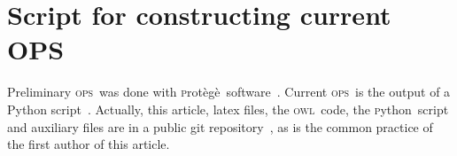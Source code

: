 \documentclass[10pt,letterpaper]{article}
\newcommand{\ops}{\textsc{ops}}
\newcommand{\vcps}{\textsc{vcps}}
\newcommand{\owl}{\textsc{owl}}
\newcommand{\skos}{\textsc{skos}}
\newcommand{\obs}{\textsc{obs}}
\newcommand{\vbs}{\textsc{vbs}}
\newcommand{\python}{\textsc{p}ython}
\newcommand{\protege}{\textsc{p}rot\`eg\`e}
\begin{document}
%

\section{Script for constructing current OPS}\label{ap:script}
Preliminary \ops\ was done with \protege\ software~\cite{protege}. Current \ops\ is the output of a Python script~\cite{opsScript}. Actually, this article, latex files, the \owl\ code, the \python\ script and auxiliary files are in a public git repository~\cite{opsRepo}, as is the common practice of the first author of this article.

 


\end{document}
